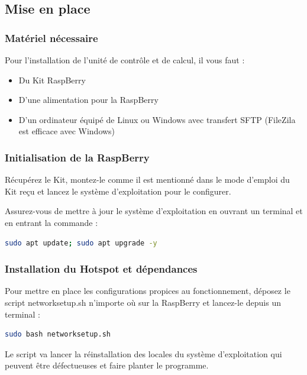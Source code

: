 \documentclass[11pt]{article}
\begin{document}
\subsection{Mise en place}

\subsubsection{Matériel nécessaire}

Pour l'installation de l'unité de contrôle et de calcul, il vous faut :

\begin{itemize}
	\item Du Kit RaspBerry
	\item D'une alimentation pour la RaspBerry
	\item D'un ordinateur équipé de Linux ou Windows avec transfert SFTP (FileZila est efficace avec Windows)
\end{itemize}

\subsubsection{Initialisation de la RaspBerry}

Récupérez le Kit, montez-le comme il est mentionné dans le mode d'emploi du Kit reçu et lancez le système d'exploitation pour le configurer.

Assurez-vous de mettre à jour le système d'exploitation en ouvrant un terminal et en entrant la commande :

\begin{lstlisting}[language=bash]
	sudo apt update; sudo apt upgrade -y
\end{lstlisting}

\subsubsection{Installation du Hotspot et dépendances}

Pour mettre en place les configurations propices au fonctionnement, déposez le script networksetup.sh n'importe où sur la RaspBerry et lancez-le depuis un terminal :

\begin{lstlisting}[language=bash]
	sudo bash networksetup.sh
\end{lstlisting}

Le script va lancer la réinstallation des locales du système d'exploitation qui peuvent être défectueuses et faire planter le programme.
\end{document}
